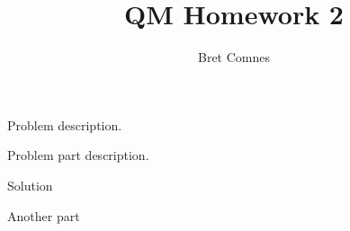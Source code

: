 \documentclass{bachw}
\author{Bret Comnes}
\title{QM Homework 2}
\begin{document}
Problem description.

\subproblem{}
Problem part description.

\solution{}
Solution

\pagebreak[4]

\subproblem{}
Another part

\solution{}

\end{document}
